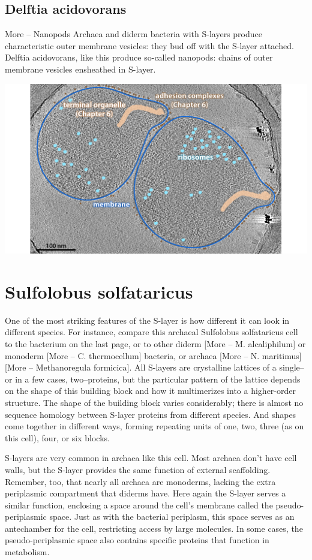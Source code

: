 \documentclass[]{tufte-book}
\begin{document}
\subsection{Delftia acidovorans}\label{delftia-acidovorans}

More -- Nanopods Archaea and diderm bacteria with S-layers produce
characteristic outer membrane vesicles: they bud off with the S-layer
attached. Delftia acidovorans, like this produce so-called nanopods:
chains of outer membrane vesicles ensheathed in S-layer.

\includegraphics{img/02_static/2_1_Mgenitalium}

\section{Sulfolobus solfataricus}\label{sulfolobus-solfataricus}

One of the most striking features of the S-layer is how different it can
look in different species. For instance, compare this archaeal
Sulfolobus solfataricus cell to the bacterium on the last page, or to
other diderm {[}More -- M. alcaliphilum{]} or monoderm {[}More -- C.
thermocellum{]} bacteria, or archaea {[}More -- N. maritimus{]} {[}More
-- Methanoregula formicica{]}. All S-layers are crystalline lattices of
a single--or in a few cases, two--proteins, but the particular pattern
of the lattice depends on the shape of this building block and how it
multimerizes into a higher-order structure. The shape of the building
block varies considerably; there is almost no sequence homology between
S-layer proteins from different species. And shapes come together in
different ways, forming repeating units of one, two, three (as on this
cell), four, or six blocks.

S-layers are very common in archaea like this cell. Most archaea don't
have cell walls, but the S-layer provides the same function of external
scaffolding. Remember, too, that nearly all archaea are monoderms,
lacking the extra periplasmic compartment that diderms have. Here again
the S-layer serves a similar function, enclosing a space around the
cell's membrane called the pseudo-periplasmic space. Just as with the
bacterial periplasm, this space serves as an antechamber for the cell,
restricting access by large molecules. In some cases, the
pseudo-periplasmic space also contains specific proteins that function
in metabolism.
\end{document}
